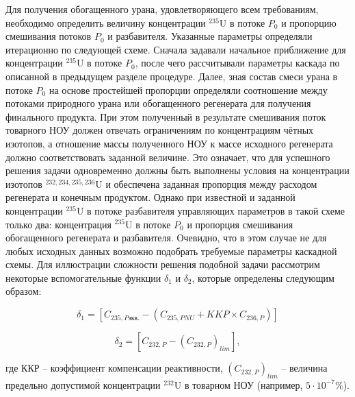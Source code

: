 Для получения обогащенного урана, удовлетворяющего всем требованиям, необходимо определить величину концентрации $^{235}$U в потоке $P_0$ и пропорцию смешивания потоков $P_0$ и разбавителя. Указанные параметры определяли итерационно по следующей схеме. Сначала задавали начальное приближение для концентрации $^{235}$U в потоке $P_0$, после чего рассчитывали параметры каскада по описанной в предыдущем разделе процедуре. Далее, зная состав смеси урана в потоке $P_0$ на основе простейшей пропорции определяли соотношение между потоками природного урана или обогащенного регенерата для получения финального продукта. При этом полученный в результате смешивания поток товарного НОУ должен отвечать ограничениям по концентрациям чётных изотопов, а отношение массы полученного НОУ к массе исходного регенерата должно соответствовать заданной величине. Это означает, что для успешного решения задачи одновременно должны быть выполнены условия на концентрации изотопов $^{232,234,235,236}$U и обеспечена заданная пропорция между расходом регенерата и конечным продуктом. Однако при известной и заданной концентрации $^{235}$U в потоке разбавителя управляющих параметров в такой схеме только два: концентрация $^{235}$U в потоке $P_0$ и пропорция смешивания обогащенного регенерата и разбавителя. Очевидно, что в этом случае не для любых исходных данных возможно подобрать требуемые параметры каскадной схемы. 
Для иллюстрации сложности решения подобной задачи рассмотрим некоторые вспомогательные функции $\delta_1$ и $\delta_2$, которые определены следующим образом:

\begin{equation} \label{d1} 
  \delta_1=\left[C_{235,P\textit{экв.}}-\left(C_{235,P\textit{NU}}+KKP\times C_{236,P}\right)\right]
\end{equation} 


\begin{equation} \label{d2} 
    \delta_2=\left[C_{232,P}-{(C_{232,P})}_{lim}\right],             
\end{equation}

где ККР -- коэффициент компенсации реактивности, $(C_{232,P})_{lim}$ -- величина предельно допустимой концентрации $^{232}$U в товарном НОУ (например, $5\cdot10^{-7}$\%).

